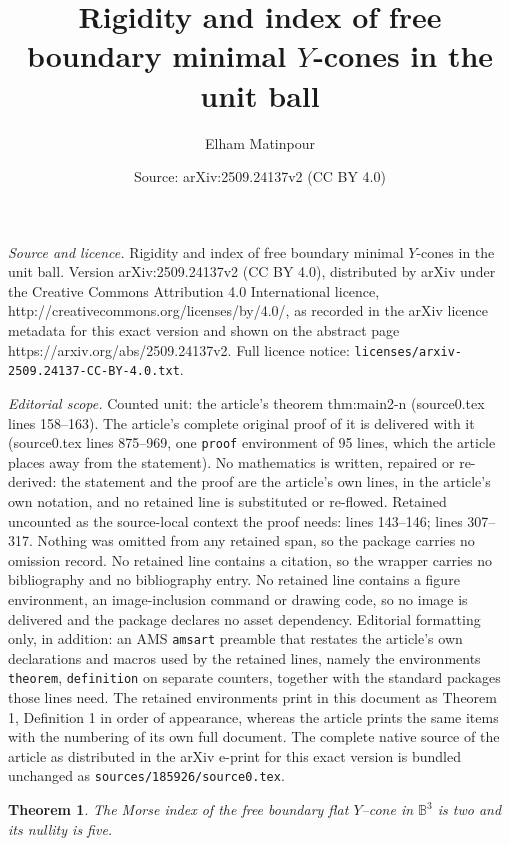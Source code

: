 \documentclass[10pt,a4paper]{amsart}
\title{Rigidity and index of free boundary minimal $Y$-cones in the unit ball}
\author{Elham Matinpour}
\date{Source: arXiv:2509.24137v2 (CC BY 4.0)}
\newtheorem{theorem}{Theorem}
\begin{document}
\maketitle

\noindent\emph{Source and licence.} Rigidity and index of free boundary minimal $Y$-cones in the unit ball. Version arXiv:2509.24137v2 (CC BY 4.0), distributed by arXiv under the Creative Commons Attribution 4.0 International licence, http://creativecommons.org/licenses/by/4.0/, as recorded in the arXiv licence metadata for this exact version and shown on the abstract page https://arxiv.org/abs/2509.24137v2. Full licence notice: \texttt{licenses/arxiv-2509.24137-CC-BY-4.0.txt}.\par\smallskip

\noindent\textit{Editorial scope.} Counted unit: the article's theorem thm:main2-n (source0.tex lines 158--163). The article's complete original proof of it is delivered with it (source0.tex lines 875--969, one \texttt{proof} environment of 95 lines, which the article places away from the statement). No mathematics is written, repaired or re-derived: the statement and the proof are the article's own lines, in the article's own notation, and no retained line is substituted or re-flowed.  Retained uncounted as the source-local context the proof needs: lines 143--146; lines 307--317.  Nothing was omitted from any retained span, so the package carries no omission record.  No retained line contains a citation, so the wrapper carries no bibliography and no bibliography entry.  No retained line contains a figure environment, an image-inclusion command or drawing code, so no image is delivered and the package declares no asset dependency.  Editorial formatting only, in addition: an AMS \texttt{amsart} preamble that restates the article's own declarations and macros used by the retained lines, namely the environments \texttt{theorem}, \texttt{definition} on separate counters, together with the standard packages those lines need.  The retained environments print in this document as Theorem 1, Definition 1 in order of appearance, whereas the article prints the same items with the numbering of its own full document.  The complete native source of the article as distributed in the arXiv e-print for this exact version is bundled unchanged as \texttt{sources/185926/source0.tex}.
\begin{theorem}\label{thm:main2}
The Morse index of the free boundary flat $Y$--cone in $\mathbb{B}^3$ 
is two and its nullity is five.
\end{theorem}
\end{document}
